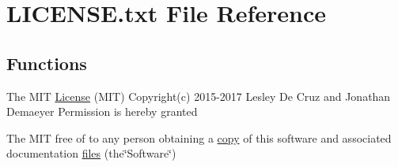\hypertarget{LICENSE_8txt}{}\section{L\+I\+C\+E\+N\+S\+E.\+txt File Reference}
\label{LICENSE_8txt}
\subsection*{Functions}
\begin{DoxyCompactItemize}
\item 
The M\+IT \hyperlink{LICENSE_8txt_a904471f5407eb071081b745c8aa5427c}{License} (M\+IT) Copyright(c) 2015-\/2017 Lesley De Cruz and Jonathan Demaeyer Permission is hereby granted
\item 
The M\+IT free of to any person obtaining a \hyperlink{LICENSE_8txt_aff1d4c6b756ebf691fa44a0904f68658}{copy} of this software and associated documentation \hyperlink{LICENSE_8txt_abdb4f4971cf029244bb81834ee9b393d}{files} (the\char`\"{}Software\char`\"{})
\end{DoxyCompactItemize}
